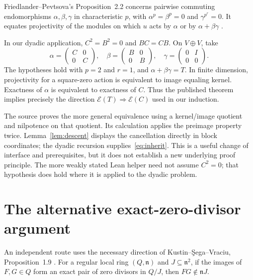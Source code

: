 \documentclass[11pt]{article}
\theoremstyle{definition}
\newcommand{\E}{\mathcal E}
\begin{document}
Friedlander--Pevtsova's Proposition~2.2 concerns pairwise commuting endomorphisms $\alpha,\beta,\gamma$ in characteristic $p$, with $\alpha^p=\beta^p=0$ and $\gamma^{p^r}=0$. It equates projectivity of the modules on which $u$ acts by $\alpha$ or by $\alpha+\beta\gamma$ \cite[Proposition~2.2; author manuscript pp.~8--9]{fp}.

In our dyadic application, $C^2=B^2=0$ and $BC=CB$. On $V\oplus V$, take
\begin{equation}\label{eq:fp-substitution}
 \alpha=\begin{pmatrix}C&0\\0&C\end{pmatrix},\quad
 \beta=\begin{pmatrix}B&0\\0&B\end{pmatrix},\quad
 \gamma=\begin{pmatrix}0&I\\0&0\end{pmatrix}.
\end{equation}
The hypotheses hold with $p=2$ and $r=1$, and $\alpha+\beta\gamma=T$. In finite dimension, projectivity for a square-zero action is equivalent to image equaling kernel. Exactness of $\alpha$ is equivalent to exactness of $C$. Thus the published theorem implies precisely the direction $\E(T)\Rightarrow\E(C)$ used in our induction.

The source proves the more general equivalence using a kernel/image quotient and nilpotence on that quotient. Its calculation applies the preimage property twice. Lemma~\ref{lem:descent} displays the cancellation directly in block coordinates; the dyadic recursion supplies~\eqref{eq:inherit}. This is a useful change of interface and prerequisites, but it does not establish a new underlying proof principle. The more weakly stated Lean helper need not assume $C^2=0$; that hypothesis does hold where it is applied to the dyadic problem.

\section{The alternative exact-zero-divisor argument}\label{sec:ksv}

An independent route uses the necessary direction of Kustin--\c{S}ega--Vraciu, Proposition~1.9 \cite[Proposition~1.9, p.~6]{ksv}. For a regular local ring $(Q,\mathfrak n)$ and $J\subseteq\mathfrak n^2$, if the images of $F,G\in Q$ form an exact pair of zero divisors in $Q/J$, then $FG\notin\mathfrak nJ$.
\end{document}
